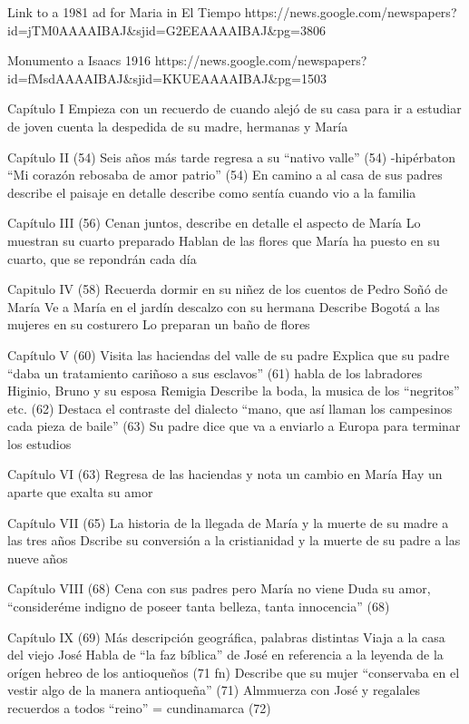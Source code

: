 Link to a 1981 ad for Maria in El Tiempo
https://news.google.com/newspapers?id=jTM0AAAAIBAJ&sjid=G2EEAAAAIBAJ&pg=3806%

Monumento a Isaacs 1916
https://news.google.com/newspapers?id=fMsdAAAAIBAJ&sjid=KKUEAAAAIBAJ&pg=1503%

Capítulo I
Empieza con un recuerdo de cuando alejó de su casa para ir a estudiar de joven
cuenta la despedida de su madre, hermanas y María

Capítulo II (54)
Seis años más tarde regresa a su “nativo valle” (54)   -hipérbaton 
“Mi corazón rebosaba de amor patrio” (54)
En camino a al casa de sus padres describe el paisaje en detalle
describe como sentía cuando vio a la familia 

Capítulo III (56)
Cenan juntos, describe en detalle el aspecto de María 
Lo muestran su cuarto preparado
Hablan de las flores que María ha puesto en su cuarto, que se repondrán cada día

Capitulo IV (58)
Recuerda dormir en su niñez de los cuentos de Pedro
Soñó de María
Ve a María en el jardín descalzo con su hermana
Describe Bogotá a las mujeres en su costurero
Lo preparan un baño de flores

Capítulo V (60)
Visita las haciendas del valle de su padre
Explica que su padre “daba un tratamiento cariñoso a sus esclavos” (61)
habla de los labradores Higinio, Bruno y su esposa Remigia
Describe la boda, la musica de los “negritos” etc. (62)
Destaca el contraste del dialecto “mano, que así llaman los campesinos cada pieza de baile” (63)
Su padre dice que va a enviarlo a Europa para terminar los estudios

Capítulo VI (63)
Regresa de las haciendas y nota un cambio en María
Hay un aparte que exalta su amor

Capítulo VII (65)
La historia de la llegada de María y la muerte de su madre a las tres años
Dscribe su conversión a la cristianidad y la muerte de su padre a las nueve años

Capítulo VIII (68)
Cena con sus padres pero María no viene
Duda su amor, “consideréme indigno de poseer tanta belleza, tanta innocencia” (68)

Capítulo IX (69)
Más descripción geográfica, palabras distintas
Viaja a la casa del viejo José
Habla de “la faz bíblica” de José en referencia a la leyenda de la orígen hebreo de los antioqueños (71 fn)
Describe que su mujer “conservaba en el vestir algo de la manera antioqueña” (71)
Almmuerza con José y regalales recuerdos a todos
“reino” = cundinamarca (72)

